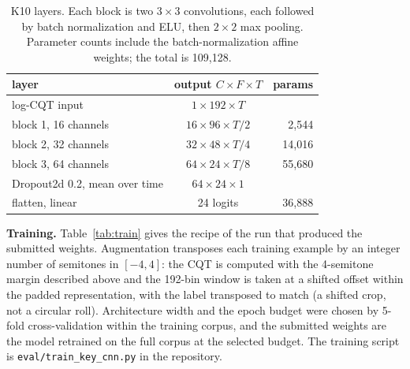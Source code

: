 \documentclass{article}
\begin{document}
\begin{table}[t]
\centering\small
\setlength{\tabcolsep}{5pt}
\begin{tabular}{@{}lcr@{}}
\toprule
layer & output $C{\times}F{\times}T$ & params \\
\midrule
log-CQT input & $1{\times}192{\times}T$ & \\
block 1, 16 channels & $16{\times}96{\times}T/2$ & 2{,}544 \\
block 2, 32 channels & $32{\times}48{\times}T/4$ & 14{,}016 \\
block 3, 64 channels & $64{\times}24{\times}T/8$ & 55{,}680 \\
Dropout2d 0.2, mean over time & $64{\times}24{\times}1$ & \\
flatten, linear & 24 logits & 36{,}888 \\
\bottomrule
\end{tabular}
\caption{K10 layers. Each block is two $3{\times}3$ convolutions, each followed by batch
normalization and ELU, then $2{\times}2$ max pooling. Parameter counts include the
batch-normalization affine weights; the total is 109{,}128.}
\label{tab:arch}
\end{table}

\textbf{Training.} Table~\ref{tab:train} gives the recipe of the run that produced the
submitted weights. Augmentation transposes each training example by an integer number of
semitones in $[-4, 4]$: the CQT is computed with the 4-semitone margin described above
and the 192-bin window is taken at a shifted offset within the padded representation,
with the label transposed to match (a shifted crop, not a circular roll). Architecture
width and the epoch budget were chosen by 5-fold cross-validation within the training
corpus, and the submitted weights are the model retrained on the full corpus at the
selected budget. The training script is \texttt{eval/train\_key\_cnn.py} in the
repository.
\end{document}
